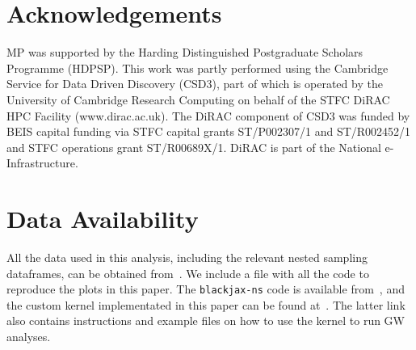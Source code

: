 \documentclass[fleqn,usenatbib]{mnras}
\begin{document}
\section*{Acknowledgements}

MP was supported by the Harding Distinguished Postgraduate Scholars Programme (HDPSP). 
This work was partly performed using the Cambridge Service for Data Driven Discovery (CSD3), 
part of which is operated by the University of Cambridge Research Computing on behalf of the
STFC DiRAC HPC Facility (www.dirac.ac.uk). The DiRAC component of CSD3 was funded by BEIS 
capital funding via STFC capital grants ST/P002307/1 and ST/R002452/1 and STFC operations 
grant ST/R00689X/1. DiRAC is part of the National e-Infrastructure.

\section*{Data Availability}

 
All the data used in this analysis, including the relevant nested sampling dataframes, 
can be obtained from~\cite{Prathaban_2025_zenodo}. We include a file with all the 
code to reproduce the plots in this paper. The \texttt{blackjax-ns} code is available 
from~\cite{blackjax_ns_github}, and the custom kernel implementated in this paper can
be found at~\cite{Prathaban_2025_github}. The latter link also contains instructions and
example files on how to use the kernel to run GW analyses.









\end{document}
